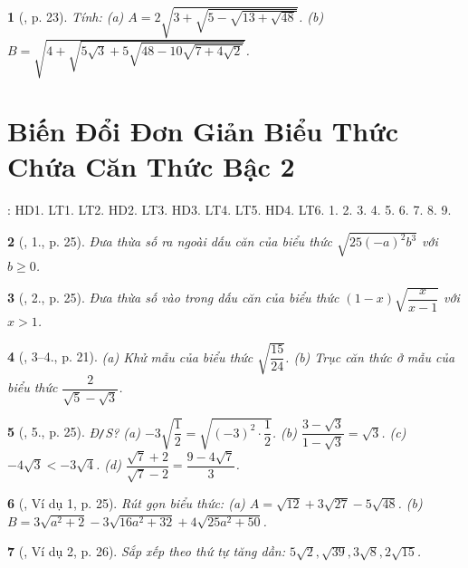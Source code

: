 \documentclass{article}
\newtheorem{baitoan}{}
\begin{document}
\begin{baitoan}[\cite{Binh_boi_duong_Toan_9_tap_1}, p. 23]
	Tính: (a) $A = 2\sqrt{3 + \sqrt{5 - \sqrt{13 + \sqrt{48}}}}$. (b) $B = \sqrt{4 + \sqrt{5\sqrt{3} + 5\sqrt{48 - 10\sqrt{7 + 4\sqrt{2}}}}}$.
\end{baitoan}


\section{Biến Đổi Đơn Giản Biểu Thức Chứa Căn Thức Bậc 2}
\cite[Chap. III, \S3, pp. 61--71]{SGK_Toan_9_Canh_Dieu_tap_1}: HD1. LT1. LT2. HD2. LT3. HD3. LT4. LT5. HD4. LT6. 1. 2. 3. 4. 5. 6. 7. 8. 9.

\begin{baitoan}[\cite{Binh_boi_duong_Toan_9_tap_1}, 1., p. 25]
	Đưa thừa số ra ngoài dấu căn của biểu thức $\sqrt{25(-a)^2b^3}$ với $b\ge0$.
\end{baitoan}

\begin{baitoan}[\cite{Binh_boi_duong_Toan_9_tap_1}, 2., p. 25]
	Đưa thừa số vào trong dấu căn của biểu thức $(1 - x)\sqrt{\dfrac{x}{x - 1}}$ với $x > 1$.
\end{baitoan}

\begin{baitoan}[\cite{Binh_boi_duong_Toan_9_tap_1}, 3--4., p. 21]
	(a) Khử mẫu của biểu thức $\sqrt{\dfrac{15}{24}}$. (b) Trục căn thức ở mẫu của biểu thức $\dfrac{2}{\sqrt{5} - \sqrt{3}}$.
\end{baitoan}

\begin{baitoan}[\cite{Binh_boi_duong_Toan_9_tap_1}, 5., p. 25]
	{\rm Đ{\tt/}S?} (a) $-3\sqrt{\dfrac{1}{2}} = \sqrt{(-3)^2\cdot\dfrac{1}{2}}$. (b) $\dfrac{3 - \sqrt{3}}{1 - \sqrt{3}} = \sqrt{3}$. (c) $-4\sqrt{3} < -3\sqrt{4}$. (d) $\dfrac{\sqrt{7} + 2}{\sqrt{7} - 2} = \dfrac{9 - 4\sqrt{7}}{3}$.
\end{baitoan}

\begin{baitoan}[\cite{Binh_boi_duong_Toan_9_tap_1}, Ví dụ 1, p. 25]
	Rút gọn biểu thức: (a) $A = \sqrt{12} + 3\sqrt{27} - 5\sqrt{48}$. (b) $B = 3\sqrt{a^2 + 2} - 3\sqrt{16a^2 + 32} + 4\sqrt{25a^2 + 50}$.
\end{baitoan}

\begin{baitoan}[\cite{Binh_boi_duong_Toan_9_tap_1}, Ví dụ 2, p. 26]
	Sắp xếp theo thứ tự tăng dần: $5\sqrt{2},\sqrt{39},3\sqrt{8},2\sqrt{15}$.
\end{baitoan}
\end{document}
